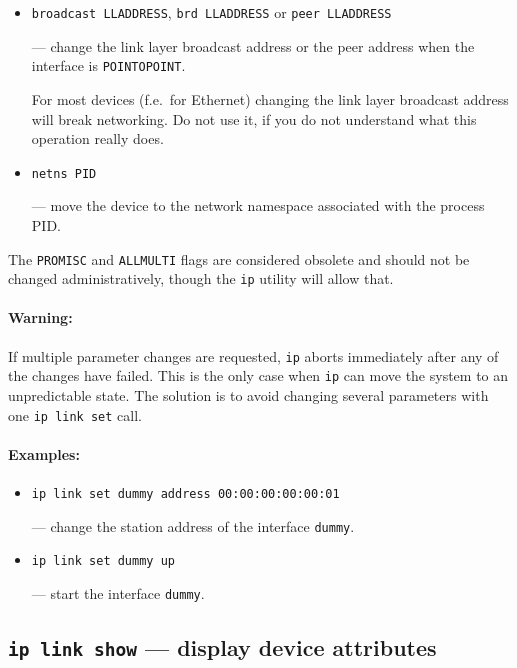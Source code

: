 \begin{itemize}
\item \verb|broadcast LLADDRESS|, \verb|brd LLADDRESS| or \verb|peer LLADDRESS|

--- change the link layer broadcast address or the peer address when
the interface is \verb|POINTOPOINT|.

\vskip 1mm
\begin{NB}
For most devices (f.e.\ for Ethernet) changing the link layer
broadcast address will break networking.
Do not use it, if you do not understand what this operation really does.
\end{NB}

\item \verb|netns PID|

--- move the device to the network namespace associated with the process PID.

\end{itemize}

\vskip 1mm
\begin{NB}
The \verb|PROMISC| and \verb|ALLMULTI| flags are considered
obsolete and should not be changed administratively, though
the {\tt ip} utility will allow that.
\end{NB}

\paragraph{Warning:} If multiple parameter changes are requested,
\verb|ip| aborts immediately after any of the changes have failed.
This is the only case when \verb|ip| can move the system to
an unpredictable state. The solution is to avoid changing
several parameters with one {\tt ip link set} call.

\paragraph{Examples:}
\begin{itemize}
\item \verb|ip link set dummy address 00:00:00:00:00:01|

--- change the station address of the interface \verb|dummy|.

\item \verb|ip link set dummy up|

--- start the interface \verb|dummy|.

\end{itemize}


\subsection{{\tt ip link show} --- display device attributes}
\label{IP-LINK-SHOW}

